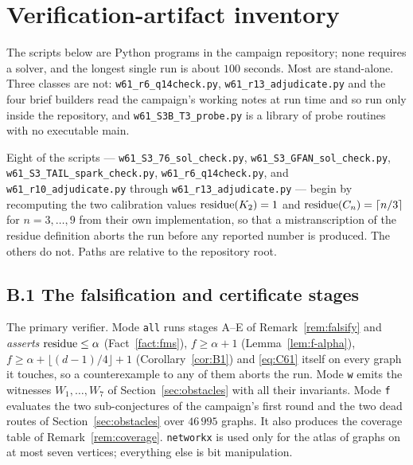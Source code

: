 \section{Verification-artifact inventory}\label{app:scripts}

The scripts below are Python programs in the campaign repository; none requires a solver,
and the longest single run is about $100$ seconds. Most are stand-alone. Three classes are
not: \texttt{w61\_r6\_q14check.py}, \texttt{w61\_r13\_adjudicate.py} and the four brief
builders read the campaign's working notes at run time and so run only inside the
repository, and \texttt{w61\_S3B\_T3\_probe.py} is a library of probe routines with no
executable main.

Eight of the scripts --- \texttt{w61\_S3\_76\_sol\_check.py},
\texttt{w61\_S3\_GFAN\_sol\_check.py}, \texttt{w61\_S3\_TAIL\_spark\_check.py},
\texttt{w61\_r6\_q14check.py}, and \texttt{w61\_r10\_adjudicate.py} through
\texttt{w61\_r13\_adjudicate.py} --- begin by recomputing the two calibration values
$\operatorname{residue}(K_2) = 1$ and $\operatorname{residue}(C_n) = \lceil n/3 \rceil$ for $n = 3,\dots,9$ from their own
implementation, so that a mistranscription of the residue definition aborts the run before
any reported number is produced. The others do not. Paths are relative to the repository
root.

\subsection*{B.1 The falsification and certificate stages}

\begin{description}[leftmargin=1.5em,style=nextline]
\item[\texttt{notes/proofs/wowii61\_verify.py}]
The primary verifier. Mode \texttt{all} runs stages A--E of Remark~\ref{rem:falsify} and
\emph{asserts} $\operatorname{residue} \le \alpha$ (Fact~\ref{fact:fms}), $f \ge \alpha+1$
(Lemma~\ref{lem:f-alpha}), $f \ge \alpha + \lfloor (d-1)/4 \rfloor + 1$
(Corollary~\ref{cor:B1}) and \eqref{eq:C61} itself on every graph it touches, so a
counterexample to any of them aborts the run. Mode \texttt{w} emits the witnesses
$W_1,\dots,W_7$ of Section~\ref{sec:obstacles} with all their invariants. Mode \texttt{f}
evaluates the two sub-conjectures of the campaign's first round and the two dead routes of
Section~\ref{sec:obstacles} over $46\,995$ graphs. It also produces the coverage table of
Remark~\ref{rem:coverage}. \texttt{networkx} is used only for the atlas of graphs on at most
seven vertices; everything else is bit manipulation.
\end{description}


